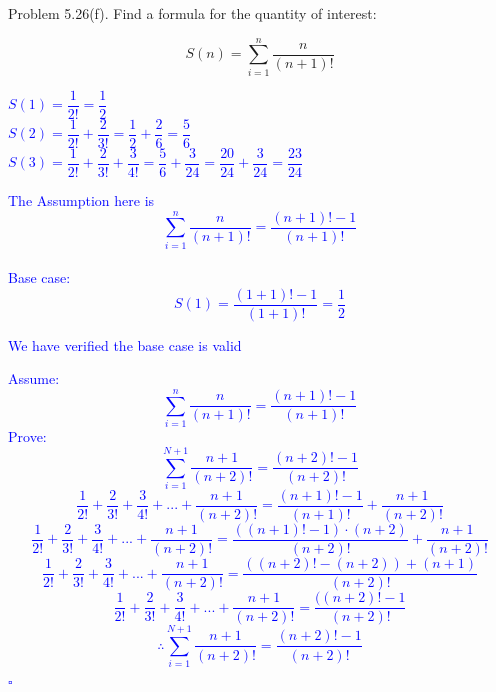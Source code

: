 \documentclass{article}
\begin{document}
\clearpage
\begin{addmargin}[2em]{2em}
	Problem 5.26(f). Find a formula for the quantity of interest:
	\begin{center}
		$$S(n) = \sum_{i=1}^{n} \dfrac{n}{(n+1)!}$$
	\end{center}
	\textcolor{blue}{
		\begin{addmargin}[2em]{2em}
			\begin{spacing}{2.2}
				$S(1) = \dfrac{1}{2!} = \dfrac{1}{2}$\\
				$S(2) = \dfrac{1}{2!}+\dfrac{2}{3!} = \dfrac{1}{2} + \dfrac{2}{6} = \dfrac{5}{6}$\\
				$S(3) = \dfrac{1}{2!} + \dfrac{2}{3!} + \dfrac{3}{4!} = \dfrac{5}{6} + \dfrac{3}{24} = \dfrac{20}{24} + \dfrac{3}{24} = \dfrac{23}{24}$
			\end{spacing}
		\noindent The Assumption here is $$\sum_{i=1}^{n} \dfrac{n}{(n+1)!} = \dfrac{(n+1)!-1}{(n+1)!}$$ \\
		Base case: $$S(1) = \dfrac{(1+1)!-1}{(1+1)!} = \dfrac{1}{2}$$
		\begin{center}
			We have verified the base case is valid
		\end{center}
		Assume: $$\sum_{i=1}^{n} \dfrac{n}{(n+1)!} = \dfrac{(n+1)!-1}{(n+1)!}$$
		Prove: $$\sum_{i=1}^{N+1} \dfrac{n+1}{(n+2)!} = \dfrac{(n+2)!-1}{(n+2)!}$$
		$$\dfrac{1}{2!}+\dfrac{2}{3!}+\dfrac{3}{4!}+...+\dfrac{n+1}{(n+2)!} = \dfrac{(n+1)!-1}{(n+1)!}+\dfrac{n+1}{(n+2)!}$$ 
		$$\dfrac{1}{2!}+\dfrac{2}{3!}+\dfrac{3}{4!}+...+\dfrac{n+1}{(n+2)!} = \dfrac{((n+1)!-1) \cdot (n+2)}{(n+2)!}+\dfrac{n+1}{(n+2)!}$$ 
		$$\dfrac{1}{2!}+\dfrac{2}{3!}+\dfrac{3}{4!}+...+\dfrac{n+1}{(n+2)!} = \dfrac{((n+2)!-(n+2))+(n+1)}{(n+2)!}$$ 
		$$\dfrac{1}{2!}+\dfrac{2}{3!}+\dfrac{3}{4!}+...+\dfrac{n+1}{(n+2)!} = \dfrac{((n+2)!-1}{(n+2)!}$$ 
		$$\therefore \sum_{i=1}^{N+1} \dfrac{n+1}{(n+2)!} = \dfrac{(n+2)!-1}{(n+2)!}$$
		\begin{flushright}
			$\square$
		\end{flushright}
		\end{addmargin}	}
\end{addmargin}

\clearpage
\end{document}
